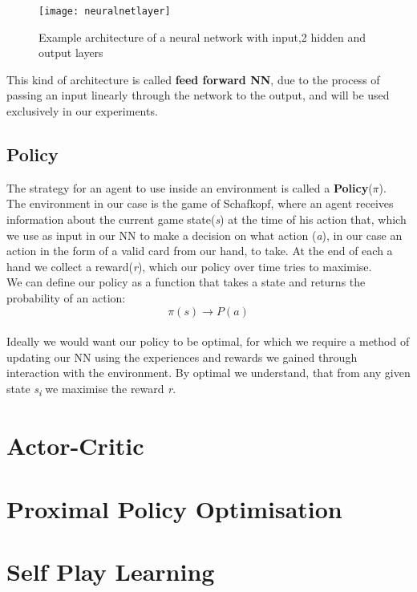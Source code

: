 \begin{figure}[h!]
    \centering
    \texttt{[image: neuralnetlayer]}
    \caption{Example architecture of a neural network with input,2 hidden and output layers}
    \label{fig:architecture}
\end{figure}
This kind of architecture is called \textbf{feed forward NN}, due to the process of passing an input linearly through
the network to the output, and will be used exclusively in our experiments.\\

\subsection{Policy}
The strategy for an agent to use inside an environment is called a \textbf{Policy}($\pi$).\\
The environment in our case is the game of Schafkopf, where an agent receives information about the current game
state(\textit{s}) at the time of his action that, which we use as input in our NN to make a decision on what action
(\textit{a}), in our case an action in the form of a valid card from our hand, to take.
At the end of each a hand we collect a reward(\textit{r}), which our policy over time tries to maximise.\\
We can define our policy as a function that takes a state and returns the probability of an action:\\
\[\pi(s)\rightarrow P(a)\]\\
Ideally we would want our policy to be optimal, for which we require a method of updating our NN using the
experiences and rewards we gained through interaction with the environment.
By optimal we understand, that from any given state \textit{s\textsubscript{i}} we maximise the reward \textit{r}.


\section{Actor-Critic}


\section{Proximal Policy Optimisation}


\section{Self Play Learning}
